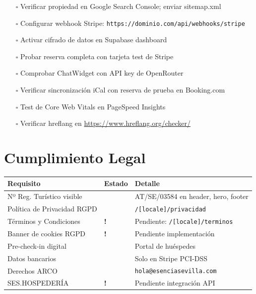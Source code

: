 \documentclass[12pt,a4paper,twoside,openright]{report}
\newcommand{\cmark}{\textcolor{Verde}{\ding{51}}}
\newcommand{\pending}{\textcolor{Naranja}{\textbf{!}}}
\begin{document}
\begin{itemize}
  \item[$\square$] Verificar propiedad en Google Search Console; enviar sitemap.xml
  \item[$\square$] Configurar webhook Stripe: \texttt{https://dominio.com/api/webhooks/stripe}
  \item[$\square$] Activar cifrado de datos en Supabase dashboard
  \item[$\square$] Probar reserva completa con tarjeta test de Stripe
  \item[$\square$] Comprobar ChatWidget con API key de OpenRouter
  \item[$\square$] Verificar sincronización iCal con reserva de prueba en Booking.com
  \item[$\square$] Test de Core Web Vitals en PageSpeed Insights
  \item[$\square$] Verificar hreflang en \url{https://www.hreflang.org/checker/}
\end{itemize}

\chapter{Cumplimiento Legal}

\begin{longtable}{L{5.5cm} C{1.5cm} L{5.5cm}}
  \toprule
  \textbf{Requisito} & \textbf{Estado} & \textbf{Detalle} \\
  \midrule
  Nº Reg. Turístico visible & \cmark & AT/SE/03584 en header, hero, footer \\
  Política de Privacidad RGPD & \cmark & \texttt{/[locale]/privacidad} \\
  Términos y Condiciones & \pending & Pendiente: \texttt{/[locale]/terminos} \\
  Banner de cookies RGPD & \pending & Pendiente implementación \\
  Pre-check-in digital & \cmark & Portal de huéspedes \\
  Datos bancarios & \cmark & Solo en Stripe PCI-DSS \\
  Derechos ARCO & \cmark & \texttt{hola@esenciasevilla.com} \\
  SES.HOSPEDERÍA & \pending & Pendiente integración API \\
  \bottomrule
\end{longtable}
\end{document}
